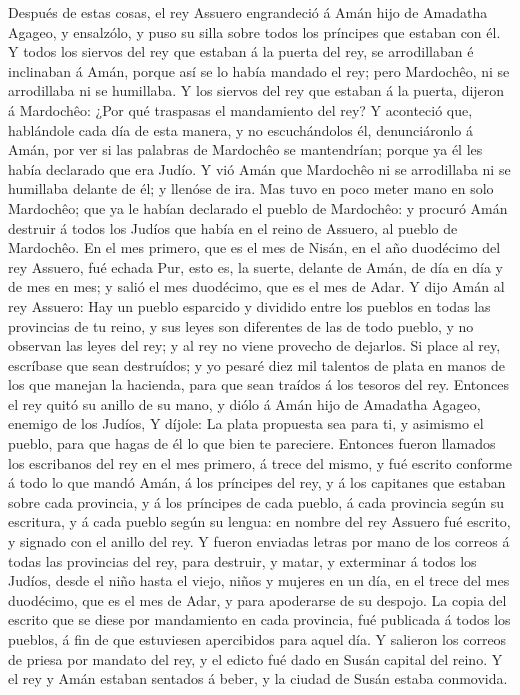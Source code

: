  Después de estas cosas, el rey Assuero engrandeció á Amán
hijo de Amadatha Agageo, y ensalzólo, y puso su silla sobre todos los
príncipes que estaban con él.  Y todos los siervos del rey
que estaban á la puerta del rey, se arrodillaban é inclinaban á Amán,
porque así se lo había mandado el rey; pero Mardochêo, ni se arrodillaba
ni se humillaba.  Y los siervos del rey que estaban á la
puerta, dijeron á Mardochêo: ¿Por qué traspasas el mandamiento del rey?
 Y aconteció que, hablándole cada día de esta manera, y no
escuchándolos él, denunciáronlo á Amán, por ver si las palabras de
Mardochêo se mantendrían; porque ya él les había declarado que era
Judío.  Y vió Amán que Mardochêo ni se arrodillaba ni se
humillaba delante de él; y llenóse de ira.  Mas tuvo en poco
meter mano en solo Mardochêo; que ya le habían declarado el pueblo de
Mardochêo: y procuró Amán destruir á todos los Judíos que había en el
reino de Assuero, al pueblo de Mardochêo.  En el mes
primero, que es el mes de Nisán, en el año duodécimo del rey Assuero,
fué echada Pur, esto es, la suerte, delante de Amán, de día en día y de
mes en mes; y salió el mes duodécimo, que es el mes de Adar.
 Y dijo Amán al rey Assuero: Hay un pueblo esparcido y
dividido entre los pueblos en todas las provincias de tu reino, y sus
leyes son diferentes de las de todo pueblo, y no observan las leyes del
rey; y al rey no viene provecho de dejarlos.  Si place al
rey, escríbase que sean destruídos; y yo pesaré diez mil talentos de
plata en manos de los que manejan la hacienda, para que sean traídos á
los tesoros del rey.  Entonces el rey quitó su anillo de su
mano, y diólo á Amán hijo de Amadatha Agageo, enemigo de los Judíos,
 Y díjole: La plata propuesta sea para ti, y asimismo el
pueblo, para que hagas de él lo que bien te pareciere. 
Entonces fueron llamados los escribanos del rey en el mes primero, á
trece del mismo, y fué escrito conforme á todo lo que mandó Amán, á los
príncipes del rey, y á los capitanes que estaban sobre cada provincia, y
á los príncipes de cada pueblo, á cada provincia según su escritura, y á
cada pueblo según su lengua: en nombre del rey Assuero fué escrito, y
signado con el anillo del rey.  Y fueron enviadas letras
por mano de los correos á todas las provincias del rey, para destruir, y
matar, y exterminar á todos los Judíos, desde el niño hasta el viejo,
niños y mujeres en un día, en el trece del mes duodécimo, que es el mes
de Adar, y para apoderarse de su despojo.  La copia del
escrito que se diese por mandamiento en cada provincia, fué publicada á
todos los pueblos, á fin de que estuviesen apercibidos para aquel día.
 Y salieron los correos de priesa por mandato del rey, y el
edicto fué dado en Susán capital del reino. Y el rey y Amán estaban
sentados á beber, y la ciudad de Susán estaba conmovida.


